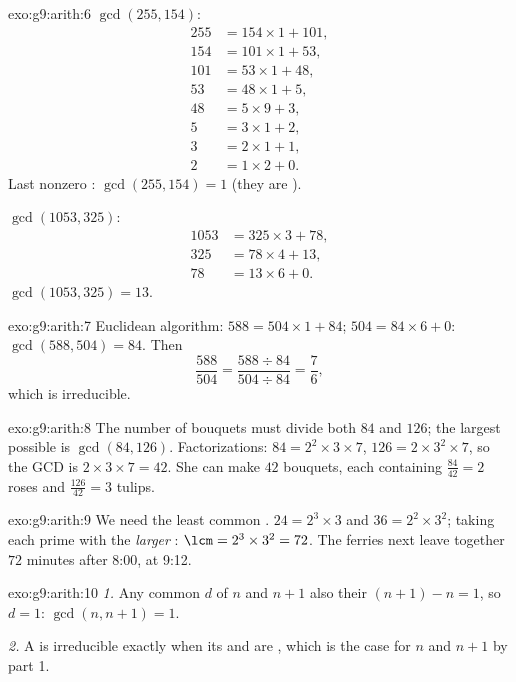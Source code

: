 \begin{solution}{exo:g9:arith:6}
$\gcd(255, 154)$:
\begin{align*}
255 &= 154 \times 1 + 101, \\
154 &= 101 \times 1 + 53, \\
101 &= 53 \times 1 + 48, \\
53 &= 48 \times 1 + 5, \\
48 &= 5 \times 9 + 3, \\
5 &= 3 \times 1 + 2, \\
3 &= 2 \times 1 + 1, \\
2 &= 1 \times 2 + 0 .
\end{align*}
Last nonzero : $\gcd(255, 154) = 1$ (they are ).

$\gcd(1053, 325)$:
\begin{align*}
1053 &= 325 \times 3 + 78, \\
325 &= 78 \times 4 + 13, \\
78 &= 13 \times 6 + 0 .
\end{align*}
$\gcd(1053, 325) = 13$.
\end{solution}

\begin{solution}{exo:g9:arith:7}
Euclidean algorithm: $588 = 504 \times 1 + 84$; $504 = 84 \times 6 + 0$:
$\gcd(588, 504) = 84$. Then
\[
\frac{588}{504} = \frac{588 \div 84}{504 \div 84} = \frac{7}{6},
\]
which is irreducible.
\end{solution}

\begin{solution}{exo:g9:arith:8}
The number of bouquets must divide both $84$ and $126$; the largest
possible is $\gcd(84, 126)$. Factorizations: $84 = 2^2 \times 3 \times
7$, $126 = 2 \times 3^2 \times 7$, so the GCD is $2 \times 3 \times 7 =
42$. She can make $42$ bouquets, each containing
$\frac{84}{42} = 2$ roses and $\frac{126}{42} = 3$ tulips.
\end{solution}

\begin{solution}{exo:g9:arith:9}
We need the least common . $24 = 2^3 \times 3$ and
$36 = 2^2 \times 3^2$; taking each prime with the \emph{larger}
: $\lcm = 2^3 \times 3^2 = 72$. The ferries next leave together
$72$ minutes after 8:00, at 9:12.
\end{solution}

\begin{solution}{exo:g9:arith:10}
\emph{1.} Any common  $d$ of $n$ and $n+1$ also  their
 $(n+1) - n = 1$, so $d = 1$: $\gcd(n, n+1) = 1$.

\emph{2.} A  is irreducible exactly when its  and
 are , which is the case for $n$ and $n + 1$ by part
1.
\end{solution}

